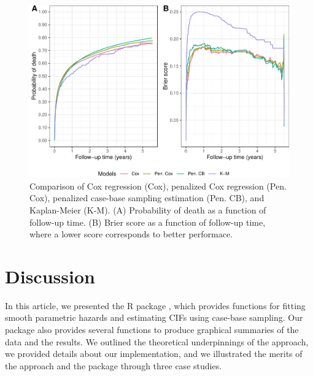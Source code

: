 \begin{Schunk}
\begin{figure}[ht]
\includegraphics[width=\textwidth,keepaspectratio=true]{./riskregressionBrier-1} \caption{\label{fig:cs3FinalBrier} Comparison of Cox regression (Cox), penalized Cox regression (Pen. Cox), penalized case-base sampling estimation (Pen. CB), and Kaplan-Meier (K-M). (A)  Probability of death as a function of follow-up time. (B) Brier score as a function of follow-up time, where a lower score corresponds to better performace.}\label{fig:riskregressionBrier}
\end{figure}
\end{Schunk}

\hypertarget{discussion}{%
\section{Discussion}\label{discussion}}

In this article, we presented the R package , which
provides functions for fitting smooth parametric hazards and estimating
CIFs using case-base sampling. Our package also provides several
functions to produce graphical summaries of the data and the results. We
outlined the theoretical underpinnings of the approach, we provided
details about our implementation, and we illustrated the merits of the
approach and the package through three case studies.

